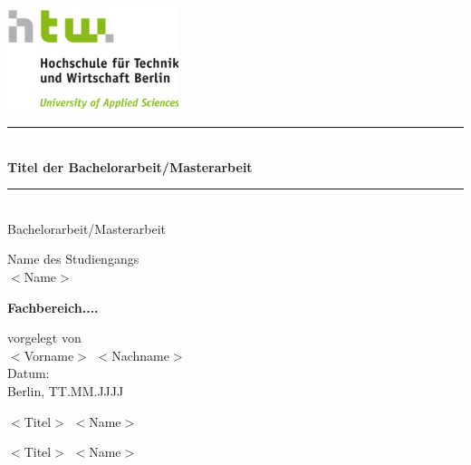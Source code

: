 \begin{center}
    \includegraphics[width=5cm, height=3cm]{images/htw_hochschule.png}
    
    \vspace*{0.7cm}
    
    \rule{\linewidth}{0.1 mm} \\[1 cm]
    
     {\LARGE \textbf{\textcolor[HTML]{70AD47} {Titel der Bachelorarbeit/Masterarbeit}}} \\ [0.5cm]
     
    \rule{\linewidth}{0.1 mm} \\[0.7 cm]
    
    {\Large Bachelorarbeit/Masterarbeit} 
    
    \vspace*{2.0cm}
    
    {\normalsize Name des Studiengangs} \\ \vspace{0.5cm} 
    {\LARGE $<$Name$>$}\\
    \vspace*{1cm}
    
    {\LARGE \textbf{\textcolor[HTML]{70AD47}{Fachbereich....}}}\\
    
    \vspace*{0.5cm}
    
    {\normalsize vorgelegt von} \\ \vspace{0.5cm}
    {\LARGE $<$Vorname$>$ $<$Nachname$>$}\\
    
    \vspace*{2cm}
    {\normalsize Datum:}\\ \vspace{0.3cm}
    {\large Berlin, TT.MM.JJJJ}\\
    
\end{center}
\vspace*{1.0cm}
    
\begin{description}[style=multiline,leftmargin=3.5cm]
      \item[\large Erstgutachter] \large $<$Titel$>$ $<$Name$>$
      \item[\large Zweitgutachter] \large $<$Titel$>$ $<$Name$>$
\end{description}